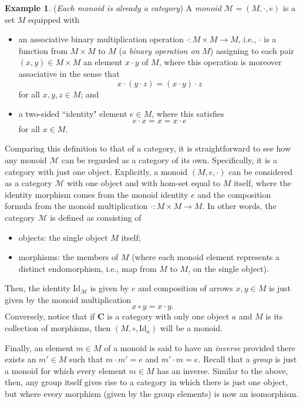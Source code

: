 \documentclass[a4paper]{book}
\theoremstyle{definition}
\newtheorem{example}{Example}[section]
\theoremstyle{definition}
\theoremstyle{definition}
\theoremstyle{theorem}
\theoremstyle{definition}
\begin{document}
\begin{example}
 (\textit{Each monoid is already a category}) A \textit{monoid}  $\mathcal{M} = (M, \cdot, e)$ is a set $M$ equipped with 
	\begin{itemize} 
		\item an associative binary multiplication operation $\cdot: M \times M \rightarrow M$, i.e., $\cdot$ is a function from $M \times M$ to $M$ (a \textit{binary operation on} $M$) assigning to each pair $(x,y) \in M \times M$ an element $x \cdot y$ of $M$, where this operation is moreover associative in the sense that 
		\begin{equation*}
		x \cdot (y \cdot z) = (x \cdot y) \cdot z
		\end{equation*} 
		for all $x, y, z \in M$; and  
		\item a two-sided ``identity" element $e \in M$, where this satisfies 
		\begin{equation*}
		e \cdot x = x = x \cdot e
		\end{equation*}  
		for all $x \in M$.  
	\end{itemize} 
	Comparing this definition to that of a category, it is straightforward to see how any monoid $\mathcal{M}$ can be regarded as a category of its own. Specifically, it is a category with just one object. Explicitly, a monoid $(M, e, \cdot)$ can be considered as a category $\mathcal{M}$ with one object and with hom-set equal to $M$ itself, where the identity morphism comes from the monoid identity $e$ and the composition formula from the monoid multiplication $\cdot:M \times M \rightarrow M$. In other words, the category $\mathcal{M}$ is defined as consisting of 
	\begin{itemize}
		\item objects: the single object $M$ itself; 
		\item morphisms: the members of $M$ (where each monoid element represents a distinct endomorphism, i.e., map from $M$ to $M$, on the single object). 
	\end{itemize}
Then, the identity $\text{Id}_{\mathcal{M}}$ is given by $e$ and composition of arrows $x, y \in M$ is just given by the monoid multiplication 
\begin{equation*}
x \circ y = x \cdot y. 
\end{equation*}
Conversely, notice that if $\textbf{C}$ is a category with only one object $a$ and $M$ is its collection of morphisms, then $(M, \circ, \text{Id}_a)$ will be a monoid. \par 
Finally, an element $m \in M$ of a monoid is said to have an \textit{inverse} provided there exists an $m' \in M$ such that $m \cdot m' = e$ and $m' \cdot m = e$. Recall that a \textit{group} is just a monoid for which every element $m \in M$ has an inverse. Similar to the above, then, any group itself gives rise to a category in which there is just one object, but where every morphism (given by the group elements) is now an isomorphism. 
\end{example}
\end{document}
